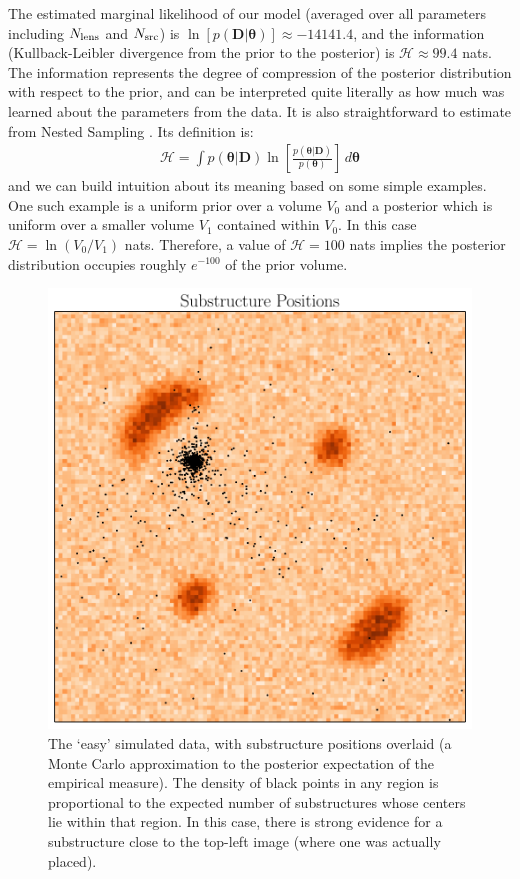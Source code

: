 \documentclass[useAMS,usenatbib]{mn2e}
\newcommand{\revisions}{\color{blue}}
\begin{document}
The estimated marginal likelihood of our model
(averaged over all parameters including $N_{\rm lens}$ and $N_{\rm src}$)
is {\revisions
$\ln\left[p(\boldsymbol{D} | \boldsymbol{\theta})\right] \approx -14141.4$, and
the information (Kullback-Leibler divergence from the prior to the posterior)
is $\mathcal{H} \approx 99.4$ nats}. The information represents the degree of
compression of the posterior distribution with respect to the prior, and can
be interpreted quite literally as how much was learned about the parameters from
the data. It is also straightforward to estimate from Nested Sampling
\citep{skilling}. Its definition is:
\begin{eqnarray}
\mathcal{H} = \int p(\boldsymbol{\theta} | \boldsymbol{D})
\ln\left[\frac{p(\boldsymbol{\theta} | \boldsymbol{D})}{p(\boldsymbol{\theta})}\right]
\, d\boldsymbol{\theta}
\end{eqnarray}
and we can build intuition about its meaning based on some simple examples. One
such example is a uniform prior over a volume $V_0$ and a posterior which is
uniform over a smaller volume $V_1$ contained within $V_0$. In this case
$\mathcal{H} = \ln(V_0/V_1)$ nats. Therefore, a value of $\mathcal{H}=100$ nats
implies the posterior distribution occupies roughly $e^{-100}$ of the prior
volume.

\begin{figure}
\begin{center}
\includegraphics[scale=0.4]{substructures1.pdf}
\caption{The {\revisions `easy'} simulated data, with substructure positions overlaid (a
Monte Carlo approximation to the posterior expectation of the empirical
measure). The density of black points in any region is proportional to the
expected number of substructures whose centers lie within that region. In this
case, there is strong evidence for a substructure close to the top-left image
(where one was actually placed).
\label{fig:substructures1}}
\end{center}
\end{figure}
\end{document}
